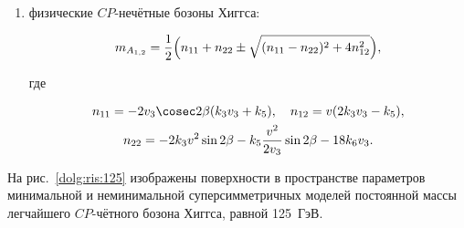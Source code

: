 \begin{enumerate}
\begin{gather}
\begin{array}{ccc}
m_{21} & m_{22} & m_{23}\\

m_{31} & m_{32} & m_{33}

\end{array} \right);

\end{gather} 



\item[б)] физические $CP$-нечётные бозоны Хиггса:

\begin{equation}

m_{A_{1,2}}=\frac{1}{2} \Bigl(n_{11}+n_{22} \pm \sqrt{(n_{11}-n_{22})^2+4 n_{12}^2} \Bigr),

\end{equation}

где

\begin{gather}

n_{11}=-2 v_3 \cosec 2 \beta (k_3 v_3+k_5),\quad n_{12}=v (2 k_3 v_3-k_5), \\

n_{22}=-2 k_3 v^2 \sin 2\beta - k_5 \frac{v^2}{2 v_3} \sin 2 \beta -18 k_6 v_3.

\end{gather}

\end{enumerate}



На рис.~\ref{dolg:ris:125} изображены поверхности в пространстве параметров минимальной и неминимальной суперсимметричных моделей постоянной массы легчайшего $CP$-чётного бозона Хиггса, равной 125~ГэВ.







